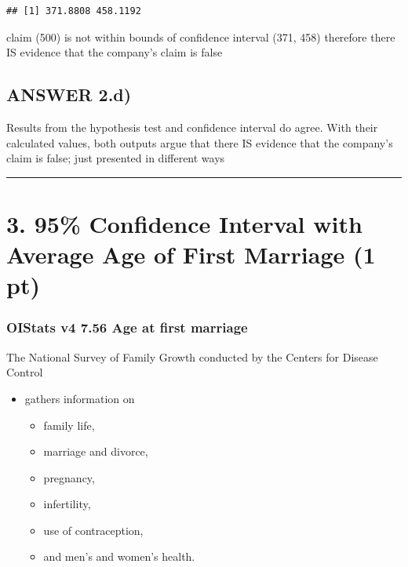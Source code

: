 \documentclass[
]{article}
\providecommand{\tightlist}{%
  \setlength{\itemsep}{0pt}\setlength{\parskip}{0pt}}
\begin{document}
\begin{verbatim}
## [1] 371.8808 458.1192
\end{verbatim}

claim (500) is not within bounds of confidence interval (371, 458)
therefore there IS evidence that the company's claim is false

\hypertarget{answer-2.d}{%
\subsection{ANSWER 2.d)}\label{answer-2.d}}

Results from the hypothesis test and confidence interval do agree. With
their calculated values, both outputs argue that there IS evidence that
the company's claim is false; just presented in different ways

\begin{center}\rule{0.5\linewidth}{0.5pt}\end{center}

\hypertarget{confidence-interval-with-average-age-of-first-marriage-1-pt}{%
\section{3. 95\% Confidence Interval with Average Age of First Marriage
(1
pt)}\label{confidence-interval-with-average-age-of-first-marriage-1-pt}}

\hypertarget{oistats-v4-7.56-age-at-first-marriage}{%
\subsubsection{OIStats v4 7.56 Age at first
marriage}\label{oistats-v4-7.56-age-at-first-marriage}}

The National Survey of Family Growth conducted by the Centers for
Disease Control

\begin{itemize}
\tightlist
\item
  gathers information on

  \begin{itemize}
  \tightlist
  \item
    family life,
  \item
    marriage and divorce,
  \item
    pregnancy,
  \item
    infertility,
  \item
    use of contraception,
  \item
    and men's and women's health.
  \end{itemize}
\end{itemize}
\end{document}
